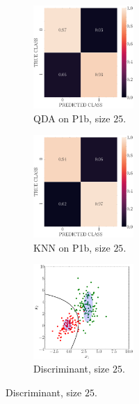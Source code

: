 \documentclass[11pt, a4 paper]{article}
\begin{document}
\begin{figure}[!htbp]
\quad    
    \begin{subfigure}[!htbp]{0.24\textwidth}
       \centering
       \includegraphics[width=1.5in]{../results/ex1/conf_mtx_QD_ML_dataset_P1b_size_25.pdf}
       \caption{QDA on P1b, size $25$.}
       \label{fig:KNN_P1b_25}
    \end{subfigure}
\quad    
    \begin{subfigure}[!htbp]{0.24\textwidth}
       \centering
       \includegraphics[width=1.5in]{../results/ex1/conf_mtx_KNN_dataset_P1b_size_25.pdf}
       \caption{KNN on P1b, size $25$.}
       \label{fig:KNN_P1b_25}
    \end{subfigure}
\quad
    \begin{subfigure}[!htbp]{0.24\textwidth}
       \centering
       \includegraphics[width=1.5in]{../results/ex1/samples_QD_ML_dataset_P1b_size_25.pdf}
       \caption{Discriminant, size $25$.}
       \label{fig:KNN_P1b_25}
    \end{subfigure}
    

\end{figure}
\end{document}
